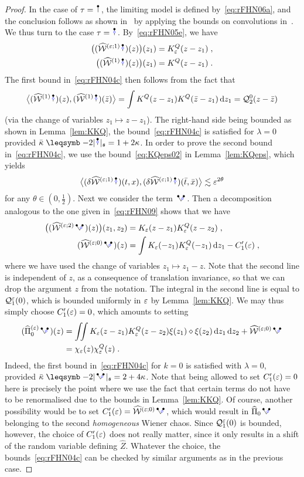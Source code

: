 \documentclass[reqno,11pt]{article}
\def\KQ{K^Q}
\def\chiQ{\chi^Q}
\def\abss#1{\abs{#1}_\mathfrak{s}}
\def\Zhat{\widehat Z}
\def\Pihat{\widehat\Pi}
\begin{document}
\begin{proof}
In the case of $\tau=\RSI$, the limiting model is defined
by~\eqref{eq:rFHN06a}, and the conclusion follows as shown
in~\cite[Thm.~10.22]{Hairer2014} by applying the bounds on convolutions 
in~\cite[Lemmas~10.14 and~10.17]{Hairer2014}. We thus turn to the case
$\tau=\RSoI$. By~\eqref{eq:rFHN05e}, we have 
\begin{align*}
 \bigpar{(\widehat\cW^{(\eps;1)}\RSoI)(z)}(z_1) &= \KQ_\eps(z-z_1)\;, \\ 
 \bigpar{(\widehat\cW^{(1)}\RSoI)(z)}(z_1) &= \KQ(z-z_1)\;. 
\end{align*}
The first bound in~\eqref{eq:rFHN04c} then follows from the fact that 
\[
 \bigpscal{(\widehat\cW^{(1)}\RSoI)(z)}{(\widehat\cW^{(1)}\RSoI)(\bar z)}
 = \int \KQ(z-z_1)\KQ(\bar z-z_1)\6z_1 = \cQ^0_2(z-\bar z)
\]
(via the change of variables $z_1\mapsto z-z_1$). The right-hand side being
bounded as shown in Lemma~\ref{lem:KKQ}, the bound~\eqref{eq:rFHN04c} is
satisfied for $\lambda=0$ provided $\bar\kappa\leqs -2\abss{\RSoI} =
1+2\kappa$. In order to prove the second bound in~\eqref{eq:rFHN04c}, we use
the bound~\eqref{eq:KQeps02} in Lemma~\ref{lem:KQeps}, which yields 
\[
 \bigpscal{(\delta\widehat\cW^{(\eps;1)}\RSoI)(t,x)}
 {(\delta\widehat\cW^{(\eps;1)}\RSoI)(\bar t,\bar x)}
 \lesssim \eps^{2\theta}
\]
for any $\theta\in(0,\frac12)$.
Next we consider the term $\RSVo$. Then a decomposition analogous to the one
given in~\eqref{eq:rFHN09} shows that we have 
\begin{align*}
\bigpar{(\widehat\cW^{(\eps;2)}\RSVo)(z)}(z_1,z_2) &=
K_\eps(z-z_1)\KQ_\eps(z-z_2)\;, \\
(\widehat\cW^{(\eps;0)}\RSVo)(z) &=
\int K_\eps(-z_1)\KQ_\eps(-z_1)\6z_1 - C_1'(\eps)\;,
\end{align*}
where we have used the change of variables $z_1\mapsto z_1-z$.
Note that the second line is independent of $z$, as a consequence of
translation invariance, so that we can drop the argument $z$ from the notation.
The integral in the second line is equal to ${\mathcal Q}^\varepsilon_1(0)$, which is bounded
uniformly in $\varepsilon$ by Lemma~\ref{lem:KKQ}. We may thus simply choose
$C_1'(\varepsilon)=0$, which amounts to setting 
\begin{align*}
 (\Pihat_0^{(\eps)}\RSVo)(z) 
 &= \iint K_\eps(z-z_1)\KQ_\eps(z-z_2) \xi(z_1)\diamond\xi(z_2) \6z_1\6z_2 
 + \widehat\cW^{(\eps;0)}\RSVo \\
 &= \chi_\eps(z) \chiQ_\eps(z)\;.
\end{align*}
Indeed, the first bound in~\eqref{eq:rFHN04c} for $k=0$ is satisfied with
$\lambda=0$, provided $\bar\kappa\leqs-2\abss{\RSVo}=2+4\kappa$. Note that
being
allowed to set $C_1'(\varepsilon)=0$ here is precisely the point where we use the fact
that certain terms do not have to be renormalised due to the bounds in
Lemma~\ref{lem:KKQ}. Of course, another possibility would be to set
$C_1'(\eps)=\widehat\cW^{(\eps;0)}\RSVo$, which would result in $\Pihat_0\RSVo$
belonging to the second \emph{homogeneous} Wiener chaos. Since ${\mathcal Q}^\varepsilon_1(0)$
is bounded, however, the choice of $C_1'(\varepsilon)$ does not really matter, since it
only results in a shift of the random variable defining $\Zhat$. Whatever the
choice, the bounds~\eqref{eq:rFHN04c} can be checked by similar arguments as in
the previous case. 


\end{proof}
\end{document}
